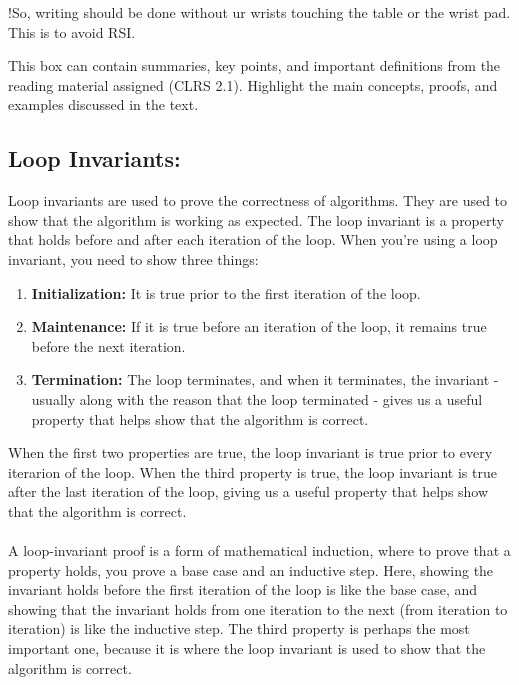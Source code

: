 
!So, writing should be done without ur wrists touching the table or the wrist pad. This is to avoid RSI.\\


\begin{tcolorbox}[title=Chapter Quick Summary Notes (CRLS 2.1)]
  This box can contain summaries, key points, and important definitions from the reading material assigned (CLRS 2.1). Highlight the main concepts, proofs, and examples discussed in the text.
\end{tcolorbox}

\subsection{Loop Invariants:}
Loop invariants are used to prove the correctness of algorithms. They are used to show that the algorithm is working as expected. The loop invariant is a property that holds before and after each iteration of the loop. When you're using a loop invariant, you need to show three things:

\begin{enumerate}
  \item \textbf{Initialization:} It is true prior to the first iteration of the loop.
  \item \textbf{Maintenance:} If it is true before an iteration of the loop, it remains true before the next iteration.
  \item \textbf{Termination:} The loop terminates, and when it terminates, the invariant - usually along with the reason that the loop terminated - gives us a useful property that helps show that the algorithm is correct.
\end{enumerate}
When the first two properties are true, the loop invariant is true prior to every iterarion of the loop. When the third property is true, the loop invariant is true after the last iteration of the loop, giving us a useful property that helps show that the algorithm is correct.
\\ \\
A loop-invariant proof is a form of mathematical induction, where to prove that a property holds, you prove a base case and an inductive step. Here, showing the invariant holds before the first iteration of the loop is like the base case, and showing that the invariant holds from one iteration to the next (from iteration to iteration) is like the inductive step. The third property is perhaps the most important one, because it is where the loop invariant is used to show that the algorithm is correct.



